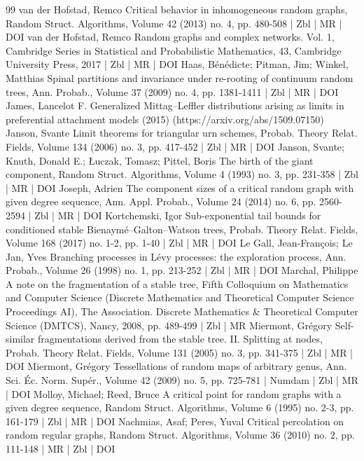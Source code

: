 \documentclass[10pt]{amsart}
\theoremstyle{definition}\newtheorem{defi}[theo]{Definition}\newtheorem{rema}[theo]{Remark}\newtheorem{exam}[theo]{Example}\newtheorem{exem}[theo]{Example}\newtheorem{nota}[theo]{Notation}
\begin{document}
\begin{thebibliography}{99}
van der Hofstad, Remco Critical behavior in inhomogeneous random graphs, Random Struct. Algorithms, Volume 42 (2013) no. 4, pp. 480-508 | Zbl | MR | DOI
van der Hofstad, Remco Random graphs and complex networks. Vol. 1, Cambridge Series in Statistical and Probabilistic Mathematics, 43, Cambridge University Press, 2017 | Zbl | MR | DOI
Haas, Bénédicte; Pitman, Jim; Winkel, Matthias Spinal partitions and invariance under re-rooting of continuum random trees, Ann. Probab., Volume 37 (2009) no. 4, pp. 1381-1411 | Zbl | MR | DOI
James, Lancelot F. Generalized Mittag–Leffler distributions arising as limits in preferential attachment models (2015) (https://arxiv.org/abs/1509.07150)
Janson, Svante Limit theorems for triangular urn schemes, Probab. Theory Relat. Fields, Volume 134 (2006) no. 3, pp. 417-452 | Zbl | MR | DOI
Janson, Svante; Knuth, Donald E.; Łuczak, Tomasz; Pittel, Boris The birth of the giant component, Random Struct. Algorithms, Volume 4 (1993) no. 3, pp. 231-358 | Zbl | MR | DOI
Joseph, Adrien The component sizes of a critical random graph with given degree sequence, Ann. Appl. Probab., Volume 24 (2014) no. 6, pp. 2560-2594 | Zbl | MR | DOI
Kortchemski, Igor Sub-exponential tail bounds for conditioned stable Bienaymé–Galton–Watson trees, Probab. Theory Relat. Fields, Volume 168 (2017) no. 1-2, pp. 1-40 | Zbl | MR | DOI
Le Gall, Jean-François; Le Jan, Yves Branching processes in Lévy processes: the exploration process, Ann. Probab., Volume 26 (1998) no. 1, pp. 213-252 | Zbl | MR | DOI
Marchal, Philippe A note on the fragmentation of a stable tree, Fifth Colloquium on Mathematics and Computer Science (Discrete Mathematics and Theoretical Computer Science Proceedings AI), The Association. Discrete Mathematics \& Theoretical Computer Science (DMTCS), Nancy, 2008, pp. 489-499 | Zbl | MR
Miermont, Grégory Self-similar fragmentations derived from the stable tree. II. Splitting at nodes, Probab. Theory Relat. Fields, Volume 131 (2005) no. 3, pp. 341-375 | Zbl | MR | DOI
Miermont, Grégory Tessellations of random maps of arbitrary genus, Ann. Sci. Éc. Norm. Supér., Volume 42 (2009) no. 5, pp. 725-781 | Numdam | Zbl | MR | DOI
Molloy, Michael; Reed, Bruce A critical point for random graphs with a given degree sequence, Random Struct. Algorithms, Volume 6 (1995) no. 2-3, pp. 161-179 | Zbl | MR | DOI
Nachmias, Asaf; Peres, Yuval Critical percolation on random regular graphs, Random Struct. Algorithms, Volume 36 (2010) no. 2, pp. 111-148 | MR | Zbl | DOI

\end{thebibliography}
\end{document}
